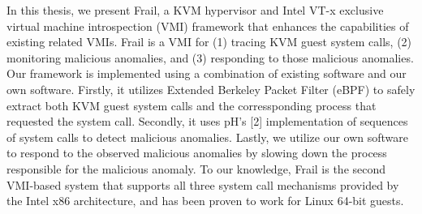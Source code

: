 \documentclass{report}
\begin{document}
\begin{spacing}{1.5}
{\large 
In this thesis, we present Frail, a KVM hypervisor and Intel VT-x exclusive virtual machine introspection (VMI) framework that enhances the capabilities of existing related VMIs. Frail is a VMI for (1) tracing KVM guest system calls, (2) monitoring malicious anomalies, and (3) responding to those malicious anomalies. Our framework is implemented using a combination of existing software and our own software. Firstly, it utilizes Extended Berkeley Packet Filter (eBPF) to safely extract both KVM guest system calls and the corressponding process that requested the system call. Secondly, it uses pH's [2] implementation of sequences of system calls to detect malicious anomalies. Lastly, we utilize our own software to respond to the observed malicious anomalies by slowing down the process responsible for the malicious anomaly. To our knowledge, Frail is the second VMI-based
system that supports all three system call mechanisms provided by the Intel x86 architecture, and has been proven to work for Linux 64-bit guests.
\newline}




























































































\end{spacing}
\end{document}
